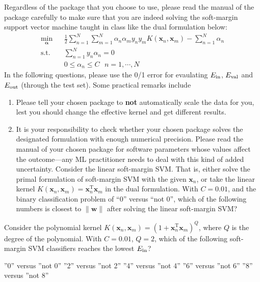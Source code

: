 \documentclass[a4paper,10pt]{exam}
\begin{document}
\begin{questions}
  Regardless of the package that you choose to use, please read the manual of the package carefully to make sure that you are indeed solving the soft-margin support vector machine taught in class like the dual formulation below:
  \begin{eqnarray*}
  	\min_{\boldsymbol\alpha} && 
  	\frac{1}{2} \sum_{n=1}^N \sum_{m=1}^N \alpha_n \alpha_m y_n y_m K(\mathbf{x}_n, \mathbf{x}_m)
  	- \sum_{n=1}^N \alpha_n \\
  	\mathrm{s.t.}        && \sum_{n=1}^N y_n \alpha_n = 0 \\ 
  	&& 0 \leq \alpha_n \leq C \ \ \ n=1,\cdots,N
  \end{eqnarray*}
  In the following questions, please use the 0/1 error for evaulating $E_{\rm in}$, $E_{\rm val}$ and $E_{\rm out}$ (through the test set). Some practical remarks include
  \begin{enumerate}[label=(\roman*)]
	  \item Please tell your chosen package to \textbf {not} automatically scale the data for you, lest you should change the effective kernel and get different results.
	  \item It is your responsibility to check whether your chosen package solves the designated formulation with enough numerical precision. Please read the manual of your chosen package for software parameters whose values affect the outcome---any ML practitioner needs to deal with this kind of added uncertainty.
	  Consider the linear soft-margin SVM. That is, either solve the primal formulation of soft-margin SVM with the given $\mathbf{x}_n$, or take the linear kernel $K(\mathbf{x}_n,\mathbf{x}_m) = \mathbf{x}_n^{\mathrm{T}} \mathbf{x}_m$ in the dual formulation. With $C=0.01$, and the binary classification problem of ``0'' versus ``not 0'', which of the following numbers is closest to $\|\mathbf{w}\|$ after solving the linear soft-margin SVM?
  \end{enumerate}
  \begin{checkboxes}
  \end{checkboxes}
  
  \question Consider the polynomial kernel $K(\mathbf{x}_n,\mathbf{x}_m) = (1+ \mathbf{x}_n^{\mathrm{T}} \mathbf{x}_m)^Q$, where $Q$ is the degree of the polynomial. With $C=0.01$, $Q=2$, which of the following soft-margin SVM classifiers reaches the lowest $E_{\rm in}$?
  \begin{checkboxes}
  	\choice ''0'' versus ''not 0''
  	\choice ''2'' versus ''not 2''
  	\choice ''4'' versus ''not 4''
  	\choice ''6'' versus ''not 6''
  	\CorrectChoice ''8'' versus ''not 8''
  \end{checkboxes}
  

\end{questions}
\end{document}

